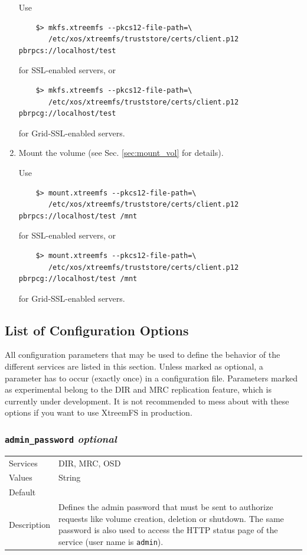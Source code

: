\documentclass[a4paper,10pt]{book}
\begin{document}
\begin{enumerate}
	Use
	\begin{verbatim}
	$> mkfs.xtreemfs --pkcs12-file-path=\
	   /etc/xos/xtreemfs/truststore/certs/client.p12 pbrpcs://localhost/test
	\end{verbatim}
	for SSL-enabled servers, or
	\begin{verbatim}
	$> mkfs.xtreemfs --pkcs12-file-path=\
	   /etc/xos/xtreemfs/truststore/certs/client.p12 pbrpcg://localhost/test
	\end{verbatim}
	for Grid-SSL-enabled servers.

 \item Mount the volume (see Sec. \ref{sec:mount_vol} for details).

	Use
	\begin{verbatim}
	$> mount.xtreemfs --pkcs12-file-path=\
	   /etc/xos/xtreemfs/truststore/certs/client.p12 pbrpcs://localhost/test /mnt
	\end{verbatim}
	for SSL-enabled servers, or
	\begin{verbatim}
	$> mount.xtreemfs --pkcs12-file-path=\
	   /etc/xos/xtreemfs/truststore/certs/client.p12 pbrpcg://localhost/test /mnt
	\end{verbatim}
	for Grid-SSL-enabled servers.

\end{enumerate}


\subsection{List of Configuration Options}
\label{sec:config}

All configuration parameters that may be used to define the behavior of the different services are listed in this section. Unless marked as optional, a parameter has to occur (exactly once) in a configuration file. Parameters marked as experimental belong to the DIR and MRC replication feature, which is currently under development. It is not recommended to mess about with these options if you want to use XtreemFS in production. 


\subsubsection{\texttt{admin\_password} \textit{optional}}
\begin{tabular}{lp{10cm}}
 Services & DIR, MRC, OSD\\
 Values   & String \\
 Default  & \\
 Description & Defines the admin password that must be sent to authorize requests like volume creation, deletion or shutdown. The same password is also used to access the HTTP status page of the service (user name is \texttt{admin}).
\end{tabular}
\end{document}
